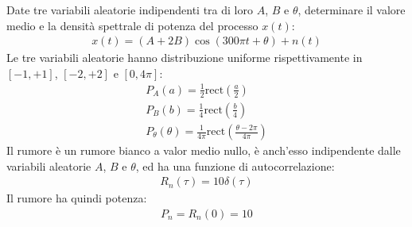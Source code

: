 \documentclass{article}
\newcommand{\rect}{\mathrm{rect}}
\begin{document}
Date tre variabili aleatorie indipendenti tra di loro $A$, $B$ e $\theta$, determinare il valore medio e la densità spettrale di potenza del processo $x(t)$:
\begin{gather*}
    x(t)=(A+2B)\cos(300\pi t+\theta)+n(t)
\end{gather*}
Le tre variabili aleatorie hanno distribuzione uniforme rispettivamente in $[-1,+1]$, $[-2,+2]$ e $[0,4\pi]$:
\begin{gather*}
    P_A(a)=\displaystyle\frac{1}{2}\rect\left(\frac{a}{2}\right)\\
    P_B(b)=\displaystyle\frac{1}{4}\rect\left(\frac{b}{4}\right)\\
    P_\theta(\theta)=\displaystyle\frac{1}{4\pi}\rect\left(\frac{\theta-2\pi}{4\pi}\right)
\end{gather*}
Il rumore è un rumore bianco a valor medio nullo, è anch'esso indipendente dalle variabili aleatorie $A$, $B$ e $\theta$, ed ha una funzione di autocorrelazione:
\begin{gather*}
    R_n(\tau)=10\delta(\tau)
\end{gather*}
Il rumore ha quindi potenza:
\begin{gather*}
    P_n=R_n(0)=10
\end{gather*}
\end{document}
